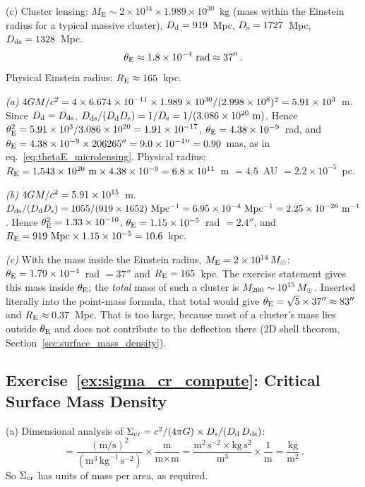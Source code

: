 \medskip
\noindent(c) Cluster lensing:
$M_{\mathrm{E}} \sim 2 \times 10^{14} \times 1.989 \times 10^{30}$~kg
(mass within the Einstein radius for a typical massive cluster),
$D_{\mathrm{d}} = 919$~Mpc, $D_{\mathrm{s}} = 1727$~Mpc, $D_{\mathrm{ds}} = 1328$~Mpc.
\begin{equation*}
    \theta_{\mathrm{E}} \approx 1.8 \times 10^{-4}~\text{rad} \approx 37'' \,.
\end{equation*}
Physical Einstein radius: $R_{\mathrm{E}} \approx 165$~kpc.
\begin{derivation}
\emph{(a)} $4G M/c^2 = 4\times6.674\times10^{-11}\times1.989\times10^{30}
/(2.998\times10^{8})^2 = 5.91\times10^{3}$~m. Since $D_{\mathrm{d}} = D_{\mathrm{ds}}$,
$D_{\mathrm{ds}}/(D_{\mathrm{d}}D_{\mathrm{s}}) = 1/D_{\mathrm{s}} = 1/(3.086\times10^{20}~\mathrm{m})$. Hence
$\theta_{\mathrm{E}}^2 = 5.91\times10^{3}/3.086\times10^{20} = 1.91\times10^{-17}$,
$\theta_{\mathrm{E}} = 4.38\times10^{-9}$~rad, and
$\theta_{\mathrm{E}} = 4.38\times10^{-9}\times206265'' = 9.0\times10^{-4}{}'' = 0.90$~mas,
as in eq.~\eqref{eq:thetaE_microlensing}. Physical radius:
$R_{\mathrm{E}} = 1.543\times10^{20}~\mathrm{m}\times4.38\times10^{-9} = 6.8\times10^{11}$~m
$= 4.5$~AU $= 2.2\times10^{-5}$~pc.

\emph{(b)} $4G M/c^2 = 5.91\times10^{15}$~m.
$D_{\mathrm{ds}}/(D_{\mathrm{d}}D_{\mathrm{s}}) = 1055/(919\times1652)~\mathrm{Mpc^{-1}} = 6.95\times10^{-4}~\mathrm{Mpc^{-1}}
= 2.25\times10^{-26}~\mathrm{m^{-1}}$. Hence $\theta_{\mathrm{E}}^2 = 1.33\times10^{-10}$,
$\theta_{\mathrm{E}} = 1.15\times10^{-5}$~rad $= 2.4''$, and
$R_{\mathrm{E}} = 919~\mathrm{Mpc}\times1.15\times10^{-5} = 10.6$~kpc.

\emph{(c)} With the mass inside the Einstein radius,
$M_{\mathrm E} = 2\times10^{14}\,M_{\odot}$:
$\theta_{\mathrm{E}} = 1.79\times10^{-4}$~rad $= 37''$ and $R_{\mathrm{E}} = 165$~kpc.
The exercise statement gives this mass inside $\theta_{\mathrm{E}}$; the \emph{total}
mass of such a cluster is $M_{200}\sim10^{15}\,M_{\odot}$.
Inserted literally into the point-mass formula, that total would give
$\theta_{\mathrm{E}} = \sqrt5\times37'' \approx 83''$ and $R_{\mathrm{E}} \approx 0.37$~Mpc. That is
too large, because most of a cluster's mass lies outside $\theta_{\mathrm{E}}$ and does not
contribute to the deflection there (2D shell theorem, Section~\ref{sec:surface_mass_density}).
\end{derivation}

\subsection*{Exercise~\ref{ex:sigma_cr_compute}: Critical Surface Mass Density}

(a) Dimensional analysis of $\Sigma_{\mathrm{cr}} = c^2 /
(4\pi G) \times D_{\mathrm{s}} / (D_{\mathrm{d}}\,D_{\mathrm{ds}})$:
\begin{equation*}
    [\Sigmacr] = \frac{(\text{m/s})^2}{(\text{m}^3\,\text{kg}^{-1}\,\text{s}^{-2})}
    \times \frac{\text{m}}{\text{m} \times \text{m}}
    = \frac{\text{m}^2\,\text{s}^{-2} \times \text{kg}\,\text{s}^{2}}
    {\text{m}^3} \times \frac{1}{\text{m}}
    = \frac{\text{kg}}{\text{m}^2} \,.
\end{equation*}
So $\Sigma_{\mathrm{cr}}$ has units of mass per area, as required. \checkmark


